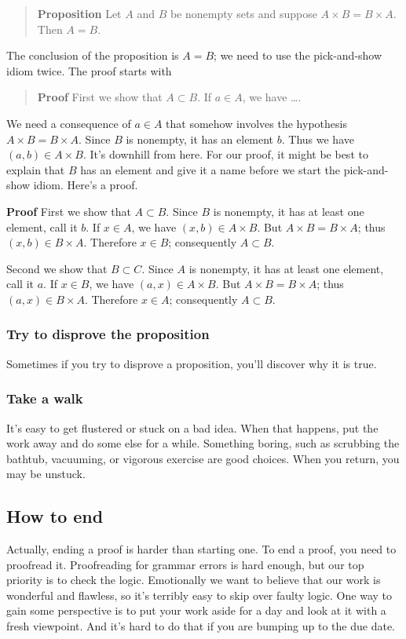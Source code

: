 \documentclass[12pt,fleqn]{article}
\newcounter{ex}\setcounter{ex}{0}
\newcounter{id}\setcounter{id}{0}
\newcounter{se}\setcounter{se}{0}
\begin{document}
\begin{quote}
\textbf{Proposition} Let \(A\) and \(B\) be nonempty sets and suppose \mbox{\(A \times B
= B \times A\)}.  Then \(A = B\).
\end{quote}
The conclusion of the proposition is \(A = B\); we need to use the 
pick-and-show idiom twice. The proof starts with
\begin{quote}
 \textbf{Proof}  First we show that \(A \subset B\). If \(a \in A\), we have \dots. 
\end{quote}
We need a consequence of \(a \in A\) that somehow involves the
hypothesis \mbox{\(A \times B = B \times A\)}.  Since \(B\) is
nonempty, it has an element \(b\). Thus we have \((a,b) \in A \times
B\).  It's downhill from here. For our proof, it might be best to
explain that \(B\) has an element and give it a name before we start
the pick-and-show idiom.  Here's a proof.




 \textbf{Proof} First we show that \(A \subset B\). Since \(B\) is
 nonempty, it has at least one element, call it \(b\). If \(x \in A\), we
 have \((x,b) \in A \times B\).  But \mbox{\(A \times B = B \times A\)};
 thus \((x,b) \in B \times A\).  Therefore \(x \in B\); consequently
\(A \subset B\).

Second we show that \(B \subset C\).  Since \(A\) is
 nonempty, it has at least one element, call it \(a\). If \(x \in B\), we
 have \((a,x) \in A \times B\).  But \(A \times B = B \times A\);
 thus \((a,x) \in B \times A\).  Therefore \(x \in A\); consequently
\(A \subset B\).

\subsubsection{Try to disprove the proposition} 
 
 Sometimes if you try to disprove a proposition, you'll discover why
 it is true.
 
 \subsubsection{Take a walk}  It's easy to get flustered or stuck on a bad idea.  When that happens,
 put the work away and do some else for a while. Something boring, such as
 scrubbing the bathtub, vacuuming,  or vigorous exercise are good choices.
  When you return, you may be unstuck.

\subsection{How to end}

Actually, ending a proof is harder than starting one. To end a proof, you need to proofread it.  Proofreading for grammar 
errors is hard enough, but our top priority is to check the logic. Emotionally we want to believe that our work is wonderful
and flawless, so it's terribly easy to skip over faulty logic.  One way to gain some perspective is to put your work aside for 
a day and look at it with a fresh viewpoint.  And it's hard to do that if you are bumping up to the due date.
\end{document}
